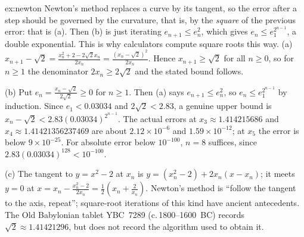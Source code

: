 \begin{solution}{ex:newton}
\idea Newton's method replaces a curve by its tangent, so the error after a step should be governed by the curvature, that is, by the \emph{square} of the previous error: that is (a). Then (b) is just iterating $e_{n+1}\le e_n^2$, which gives $e_n\le e_1^{2^{n-1}}$, a double exponential. This is why calculators compute square roots this way.
\writeup (a) $x_{n+1}-\sqrt2=\frac{x_n^2+2-2\sqrt2x_n}{2x_n}=\frac{(x_n-\sqrt2)^2}{2x_n}$. Hence $x_{n+1}\ge\sqrt2$ for all $n\ge0$, so for $n\ge1$ the denominator $2x_n\ge2\sqrt2$ and the stated bound follows.

(b) Put $e_n=\frac{x_n-\sqrt2}{2\sqrt2}\ge0$ for $n\ge1$. Then (a) says $e_{n+1}\le e_n^2$, so $e_n\le e_1^{2^{n-1}}$ by induction.
Since $e_1<0.03034$ and $2\sqrt2<2.83$, a genuine upper bound is
$x_n-\sqrt2<2.83(0.03034)^{2^{n-1}}$.
The actual errors at $x_3\approx1.414215686$ and $x_4\approx1.41421356237469$ are about $2.12\times10^{-6}$ and $1.59\times10^{-12}$; at $x_5$ the error is below $9\times10^{-25}$.
For absolute error below $10^{-100}$, $n=8$ suffices, since $2.83(0.03034)^{128}<10^{-100}$.

(c) The tangent to $y=x^2-2$ at $x_n$ is $y=(x_n^2-2)+2x_n(x-x_n)$; it meets $y=0$ at $x=x_n-\frac{x_n^2-2}{2x_n}=\frac12\left(x_n+\frac2{x_n}\right)$. Newton's method is ``follow the tangent to the axis, repeat''; square-root iterations of this kind have ancient antecedents. The Old Babylonian tablet YBC~7289 (c.\,1800--1600~BC) records $\sqrt2\approx1.41421296$, but does not record the algorithm used to obtain it.
\end{solution}

